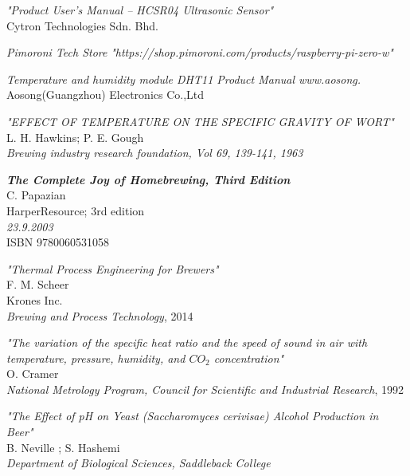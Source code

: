 \documentclass[twoside]{ctuthesis}
\theoremstyle{plain}
\theoremstyle{definition}
\theoremstyle{note}
\begin{document}
\begin{thebibliography}{9}
	\textit{"Product User’s Manual – HCSR04 Ultrasonic Sensor"}\\
	Cytron Technologies Sdn. Bhd.

	\textit{Pimoroni Tech Store}
	\textit{"https://shop.pimoroni.com/products/raspberry-pi-zero-w"}

	\textit{Temperature and humidity module DHT11 Product Manual
		www.aosong.}\\
	Aosong(Guangzhou) Electronics Co.,Ltd

	\textit{"EFFECT OF TEMPERATURE ON THE SPECIFIC GRAVITY OF WORT"}\\
	L. H. Hawkins; P. E. Gough\\
	\textit{Brewing industry research foundation, Vol 69, 139-141, 1963}

	\textit{\textbf{The Complete Joy of Homebrewing, Third Edition}}\\
	C. Papazian\\
	HarperResource; 3rd edition\\
	\textit{23.9.2003}\\
	ISBN 9780060531058

	\textit{"Thermal Process Engineering for Brewers"}\\
	F. M. Scheer\\
	Krones Inc.\\
	\textit{Brewing and Process Technology}, 2014

	\textit{"The variation of the specific heat ratio and the speed of sound in air with temperature, pressure, humidity, and $CO_2$ concentration"}\\
	O. Cramer\\
	\textit{National Metrology Program, Council for Scientific and Industrial Research}, 1992

	\textit{"The Effect of pH on Yeast (Saccharomyces cerivisae) Alcohol Production in Beer"}\\
	B. Neville ; S. Hashemi\\
	\textit{Department of Biological Sciences, Saddleback College}

\end{thebibliography}

\end{document}
